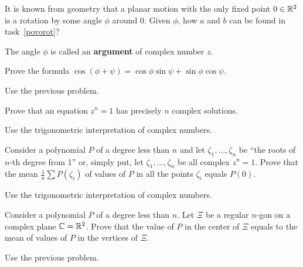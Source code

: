 \documentclass[12pt]{article}
\begin{document}
\begin{zadacha}[!]
  It is known from geometry that a planar motion with the only fixed
  point $0 \in {\mathbb R}^2$ is a rotation by some angle $\phi$ around $0$.
  Given $\phi$, how $a$ and $b$ can be found in task~\ref{povorot}?
\end{zadacha}

\begin{zamechanie}
The angle $\phi$ is called an {\bf argument} of complex number $z$.
\end{zamechanie}

\begin{zadacha}[!]
Prove the formula $\cos (\phi +\psi)= \cos\phi \sin \psi +
\sin\phi \cos \psi$.
\end{zadacha}

\begin{ukazanie}
Use the previous problem.
\end{ukazanie}

\begin{zadacha}[!]
Prove that an equation $z^n =1$ has precisely $n$ complex solutions.
\end{zadacha}

\begin{ukazanie}
Use the trigonometric interpretation of complex numbers.
\end{ukazanie}

\begin{zadacha}[*]
Consider a polynomial $P$ of a degree less than $n$ and let  $\zeta_1, \dots,
\zeta_n$ be ``the roots of $n$-th degree from 1''  or, simply put,
let $\zeta_1, \dots, \zeta_n$ be all complex $z^n =1$. Prove that the
mean $\frac 1 n \sum P(\zeta_i)$ of values of $P$ in all the points
$\zeta_i$ equals $P(0)$.
\end{zadacha}

\begin{ukazanie}
Use the trigonometric interpretation of complex numbers.
\end{ukazanie}

\begin{zadacha}[*]
Consider a polynomial $P$ of a degree less than $n$. Let $\Xi$ be a regular
$n$-gon on a complex plane ${\mathbb C} = {\mathbb R}^2$. Prove that the value of $P$ in
the center of $\Xi$ equals to the mean of values of $P$ in the
vertices of $\Xi$.
\end{zadacha}

\begin{ukazanie} Use the previous problem.
\end{ukazanie}
\end{document}
